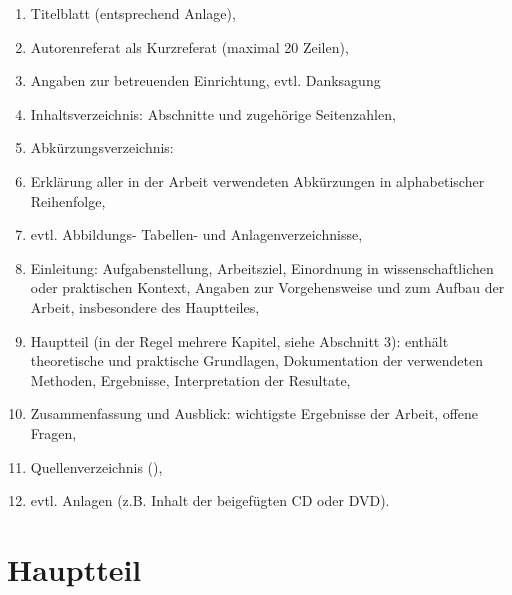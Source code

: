 \begin{enumerate}
	\item Titelblatt (entsprechend Anlage),
    \item Autorenreferat als Kurzreferat (maximal 20 Zeilen),
    \item Angaben zur betreuenden Einrichtung, evtl. Danksagung
    \item Inhaltsverzeichnis: Abschnitte und zugehörige Seitenzahlen,
    \item Abkürzungsverzeichnis:
    \item Erklärung aller in der Arbeit verwendeten Abkürzungen in alphabetischer Reihenfolge,
    \item evtl. Abbildungs- Tabellen- und Anlagenverzeichnisse,
    \item Einleitung: Aufgabenstellung, Arbeitsziel, Einordnung in wissenschaftlichen oder praktischen  Kontext, Angaben zur Vorgehensweise und zum Aufbau der Arbeit, insbesondere des Hauptteiles,
    \item Hauptteil (in der Regel mehrere Kapitel, siehe Abschnitt 3): enthält theoretische und praktische Grundlagen, Dokumentation der verwendeten Methoden, Ergebnisse, Interpretation der Resultate,
    \item Zusammenfassung und Ausblick: wichtigste Ergebnisse der Arbeit, offene Fragen,
    \item Quellenverzeichnis (),
    \item evtl. Anlagen (z.B. Inhalt der beigefügten \acs{CD} oder \acs{DVD}).
\end{enumerate}



\section{Hauptteil}
\label{sec:hauptteil}

